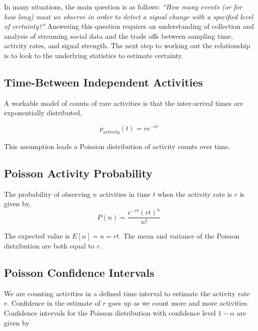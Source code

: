\documentclass{article}
\begin{document}
In many situations, the main question is as follows: \emph{``How many events (or for how long) must we observe in order to detect a signal change with a specified level of certainty?"} Answering this question requires an understanding of collection and analysis of streaming social data and the trade offs between sampling time, activity rates, and signal strength.  The next step to working out the relationship is to look to the underlying statistics to estimate certainty.

\subsection{Time-Between Independent Activities} 

A workable model of counts of rare activities is that the inter-arrival times are exponentially distributed, 

\begin{equation}
    \label{eq:tbe}
    p_{activity}(t) = r e^{-r t}
\end{equation}

This assumption leads a Poission distribution of activity counts over time.

\subsection{Poisson Activity Probability} 

The probability of observing $n$ activities in time $t$ when the activity rate is $r$ is given by,
\begin{equation}
    \label{eq:poisson}
    P(n) = \frac{e^{-r t} (r t)^n}{n!}
\end{equation}

The expected value is $E[n]=n=rt$. The mean and variance of the Poisson distribution are both equal to $r$.

\subsection{Poisson Confidence Intervals} 

We are counting activities in a defined time interval to estimate the activity rate $r$.  Confidence in the estimate of $r$ goes up as we count more and more activities. Confidence intervals for the Poisson distribution with confidence level $1-\alpha$ are given by
\end{document}
